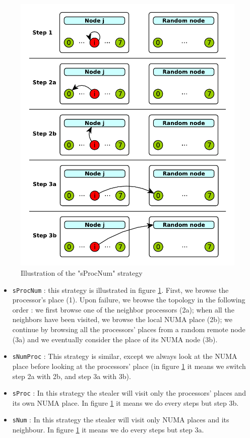 \documentclass{Styles/llncs}
\begin{document}
\begin{figure}[t]
  \centering
  \includegraphics[scale=0.7]{figures/strategies.pdf}
\caption{Illustration of the "sProcNum" strategy}
\label{fig:detail-strategy}
\end{figure}
\begin{itemize}
  \item \verb/sProcNum/ : this strategy is illustrated in figure \ref{fig:detail-strategy}.
    First, we browse the processor's place (1). Upon failure, we browse the topology in the following order : we first browse one of the neighbor processors (2a); when all the neighbors have been visited, we browse the local NUMA place (2b); we continue by browsing all the processors' places from a random remote node (3a) and we eventually consider the place of its NUMA node (3b).
  \item \verb/sNumProc/ : This strategy is similar, except we always look at the
    NUMA place before looking at the processors' place (in figure \ref{fig:detail-strategy}
    it means we switch step 2a with 2b, and step 3a with 3b).
  \item \verb/sProc/ : In this strategy the stealer will visit only the
    processors' places and its own NUMA place. In figure \ref{fig:detail-strategy} it means we do
    every steps but step 3b.
  \item \verb/sNum/ : In this strategy the stealer will visit only NUMA places
    and its neighbour. In figure \ref{fig:detail-strategy} it means we do
    every steps but step 3a.
\end{itemize}
\end{document}
